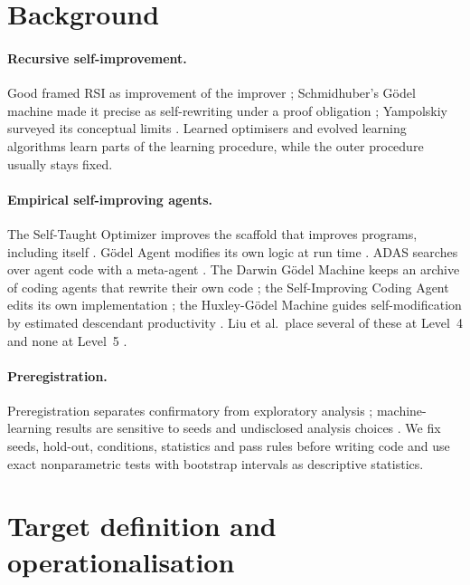 \documentclass[11pt]{article}
\begin{document}
\section{Background}

\paragraph{Recursive self-improvement.} Good framed RSI as improvement of the improver \cite{good1966}; Schmidhuber's G\"odel machine made it precise as self-rewriting under a proof obligation \cite{schmidhuber2003}; Yampolskiy surveyed its conceptual limits \cite{yampolskiy2015}. Learned optimisers \cite{andrychowicz2016} and evolved learning algorithms \cite{real2020automl} learn parts of the learning procedure, while the outer procedure usually stays fixed.

\paragraph{Empirical self-improving agents.} The Self-Taught Optimizer improves the scaffold that improves programs, including itself \cite{zelikman2024stop}. G\"odel Agent modifies its own logic at run time \cite{yin2025godel}. ADAS searches over agent code with a meta-agent \cite{hu2025adas}. The Darwin G\"odel Machine keeps an archive of coding agents that rewrite their own code \cite{zhang2026dgm}; the Self-Improving Coding Agent edits its own implementation \cite{robeyns2025sica}; the Huxley-G\"odel Machine guides self-modification by estimated descendant productivity \cite{wang2026hgm}. Liu et al.\ place several of these at Level~4 and none at Level~5 \cite{liu2026path}.

\paragraph{Preregistration.} Preregistration separates confirmatory from exploratory analysis \cite{nosek2018}; machine-learning results are sensitive to seeds and undisclosed analysis choices \cite{henderson2018,pineau2021}. We fix seeds, hold-out, conditions, statistics and pass rules before writing code and use exact nonparametric tests \cite{wilcoxon1945} with bootstrap intervals \cite{efron1979} as descriptive statistics.

\section{Target definition and operationalisation}\label{sec:def}
\end{document}
